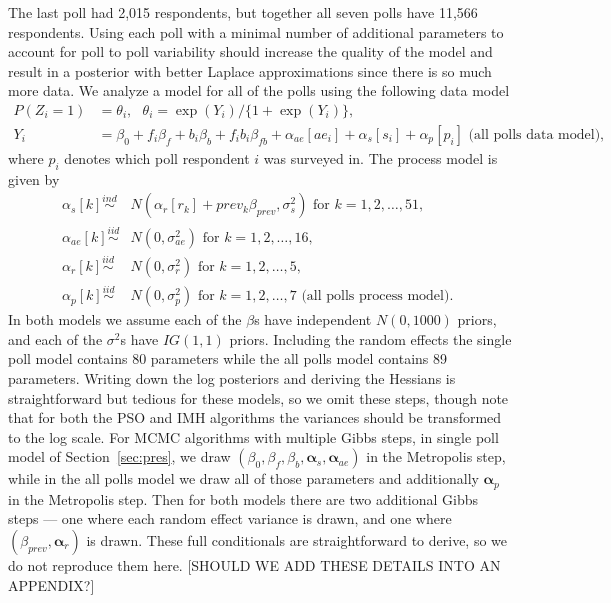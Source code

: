 \documentclass[12pt]{article}
\begin{document}
The last poll had 2,015 respondents, but together all seven polls have 11,566 respondents. Using each poll with a minimal number of additional parameters to account for poll to poll variability should increase the quality of the model and result in a posterior with better Laplace approximations since there is so much more data. We analyze a model for all of the polls using the following data model
\begin{align*}
P(Z_i = 1) &= \theta_i,\ \ \   \theta_i = \exp(Y_i)/\{1 + \exp(Y_i)\}, \\
Y_i &= \beta_0 + f_i\beta_f + b_i\beta_b + f_ib_i\beta_{fb} + \alpha_{ae}[ae_i] + \alpha_{s}[s_i] + \alpha_p[p_i]\mbox{\ \ \ \ (all polls data model), }
\end{align*}
where $p_i$ denotes which poll respondent $i$ was surveyed in. The process model is given by
\begin{align*}
\alpha_s[k] \stackrel{ind}{\sim}& N(\alpha_r[r_k] + prev_k\beta_{prev}, \sigma^2_s) \mbox{ for } k=1,2,\dots,51,\\
\alpha_{ae}[k] \stackrel{iid}{\sim}& N(0, \sigma^2_{ae}) \mbox{ for } k=1,2,\dots,16,\\
\alpha_{r}[k] \stackrel{iid}{\sim}& N(0, \sigma^2_{r}) \mbox{ for } k=1,2,\dots,5,\\ 
\alpha_{p}[k] \stackrel{iid}{\sim}& N(0, \sigma^2_{p}) \mbox{ for } k=1,2,\dots,7 \mbox{\ \ \ \ (all polls process model). }
\end{align*}
In both models we assume each of the $\beta$s have independent $N(0,1000)$ priors, and each of the 
$\sigma^2$s have $IG(1,1)$ priors. Including the random effects the single poll model contains 80 parameters while the all polls model contains 89 parameters. Writing down the log posteriors and deriving the Hessians is straightforward but tedious for these models, so we omit these steps, though note that for both the PSO and IMH algorithms the variances should be transformed to the log scale. For MCMC algorithms with multiple Gibbs steps, in single poll model of Section~\ref{sec:pres}, we draw $(\beta_0, \beta_f, \beta_b, \bm{\alpha}_{s}, \bm{\alpha}_{ae})$ in the Metropolis step, while in the all polls model we draw all of those parameters and additionally $\bm{\alpha}_p$ in the Metropolis step. Then for both models there are two additional Gibbs steps --- one where each random effect variance is drawn, and one where $(\beta_{prev}, \bm{\alpha}_r)$ is drawn. These full conditionals are straightforward to derive, so we do not reproduce them here. [SHOULD WE ADD THESE DETAILS INTO AN APPENDIX?]
\end{document}
